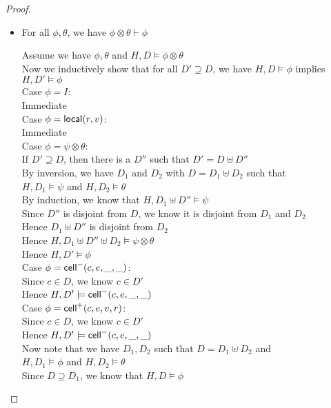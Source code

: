 \begin{proof}
\begin{itemize}
\item For all $\phi, \theta$, we have $\phi \otimes \theta \vdash \phi$
\begin{tabbedproof}
\oo Assume we have $\phi, \theta$ and $H, D \models \phi \otimes \theta$ \\
\oo Now we inductively show that for all $D' \supseteq D$, we have $H, D \models \phi$ implies $H, D' \models \phi$ \\
\ooo Case $\phi = I$: \\
\oooo Immediate \\
\ooo Case $\phi = \mathsf{local}({r}, {v})$: \\
\oooo Immediate\\
\ooo Case $\phi = \psi \otimes \theta$: \\
\oooo If $D' \supseteq D$, then there is a $D''$ such that $D' = D \uplus D''$ \\
\oooo By inversion, we have $D_1$ and $D_2$ with $D = D_1 \uplus D_2$ such that \\
\ooox $H, D_1 \models \psi$ and $H, D_2 \models \theta$ \\
\oooo By induction, we know that $H, D_1 \uplus D'' \models \psi$ \\
\oooo Since $D''$ is disjoint from $D$, we know it is disjoint from $D_1$ and $D_2$ \\
\oooo Hence $D_1 \uplus D''$ is disjoint from $D_2$ \\
\oooo Hence $H, D_1 \uplus D'' \uplus D_2 \models \psi \otimes \theta$ \\
\oooo Hence $H, D' \models \phi$ \\
\ooo Case $\phi = \mathsf{cell}^{-}({c}, {e}, {\_}, {\_})$: \\
\oooo Since $c \in D$, we know $c \in D'$ \\
\oooo Hence $H, D' \models \mathsf{cell}^{-}({c}, {e}, {\_}, {\_})$ \\
\ooo Case $\phi = \mathsf{cell}^{+}({c}, {e}, {v}, {r})$: \\
\oooo Since $c \in D$, we know $c \in D'$ \\
\oooo Hence $H, D' \models \mathsf{cell}^{-}({c}, {e}, {\_}, {\_})$ \\
\oo Now note that we have $D_1, D_2$ such that $D = D_1 \uplus D_2$ and \\
\ox $H, D_1 \models \phi$ and $H, D_2 \models \theta$ \\
\oo Since $D \supseteq D_1$, we know that $H, D \models \phi$ \\
\end{tabbedproof}


\end{itemize}
\end{proof}
